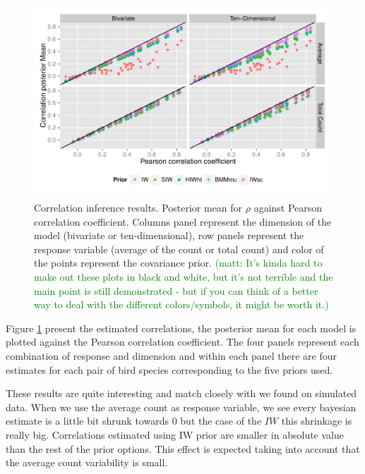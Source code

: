 \documentclass[a4paper]{article}
\newcommand{\matt}[1]{\textcolor{green}{(matt: #1)}}
\begin{document}
\begin{figure}[hbpt]
\centering
\includegraphics[width=\textwidth]{rescorr}
 \vspace{-.5in}
\caption{Correlation inference results. Posterior mean for $\rho$  against Pearson correlation coefficient. 
Columns panel represent the dimension of the model (bivariate or ten-dimensional), row panels represent the response variable (average of the count or total count)  and color of the points represent the covariance prior. \label{fig:coring}  \matt{It's kinda hard to make out these plots in black and white, but it's not terrible and the main point is still demonstrated - but if you can think of a better way to deal with the different colors/symbols, it might be worth it.}}
\end{figure}
%

Figure \ref{fig:coring} present the estimated correlations, the posterior mean for each model is plotted against the Pearson correlation coefficient. The four panels represent each combination of response and dimension and within each panel there are four estimates for each pair of bird species corresponding to the five priors used. 

These results are quite interesting and match closely with we found on simulated data. When we use the average count as response variable, we see every bayesian estimate is a little bit shrunk towards 0 but the case of the $IW$ this shrinkage is really big. Correlations estimated using IW prior are smaller in absolute value than the rest of the prior options. This effect is expected taking into account that the average count variability is small. 
\end{document}
